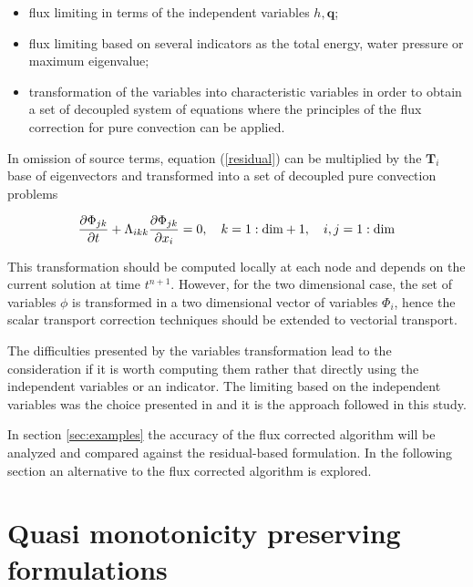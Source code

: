 \begin{itemize}
    \item flux limiting in terms of the independent variables $h, \mathbf{q}$;
    \item flux limiting based on several indicators as the total energy, water pressure or maximum eigenvalue;
    \item transformation of the variables into characteristic variables in order to obtain a set of decoupled system of equations where the principles of the flux correction for pure convection can be applied.
\end{itemize}

In omission of source terms, equation (\ref{residual}) can be multiplied by the $\mathbf{T}_i$ base of eigenvectors and transformed into a set of decoupled pure convection problems

\begin{equation}
\frac{\partial\Phi_{jk}}{\partial t} + \Lambda_{ikk} \frac{\partial\Phi_{jk}}{\partial x_i} = 0 , \quad
k = 1:\text{dim}+1 , \quad
i,j = 1:\text{dim}
\end{equation}

This transformation should be computed locally at each node and depends on the current solution at time $t^{n+1}$. However, for the two dimensional case, the set of variables $\phi$ is transformed in a two dimensional vector of variables $\Phi_i$, hence the scalar transport correction techniques should be extended to vectorial transport.


The difficulties presented by the variables transformation lead to the consideration if it is worth computing them rather that directly using the independent variables or an indicator. The limiting based on the independent variables was the choice presented in \cite{lohner2008ch9} and it is the approach followed in this study.

In section \ref{sec:examples} the accuracy of the flux corrected algorithm will be analyzed and compared against the residual-based formulation. In the following section an alternative to the flux corrected algorithm is explored.






\section{Quasi monotonicity preserving formulations}
\label{sec:monotonic}



